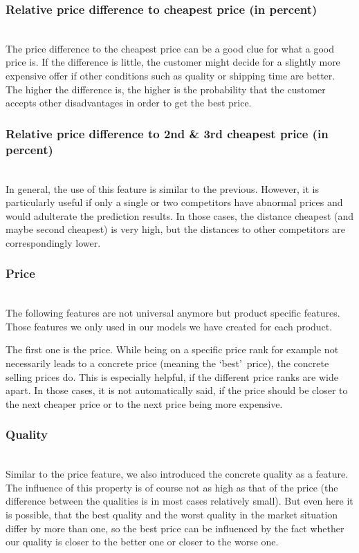 \subsubsection{Relative price difference to cheapest price (in percent)}
	~\\
	The price difference to the cheapest price can be a good clue for what a good price is. If the difference is little, the customer might decide for a slightly more expensive offer if other conditions such as quality or shipping time are better. The higher the difference is, the higher is the probability that the customer accepts other disadvantages in order to get the best price.
\subsubsection{Relative price difference to 2nd \& 3rd cheapest price (in percent)}
\label{sec:pricediff3}
	~\\
	In general, the use of this feature is similar to the previous. However, it is particularly useful if only a single or two competitors have abnormal prices and would adulterate the prediction results. In those cases, the distance cheapest (and maybe second cheapest) is very high, but the distances to other competitors are correspondingly lower.
\subsubsection{Price}
	~\\
	The following features are not universal anymore but product specific features. Those features we only used in our models we have created for each product.

	The first one is the price. While being on a specific price rank for example not necessarily leads to a concrete price (meaning the \lq{best}\rq\ price), the concrete selling prices do. This is especially helpful, if the different price ranks are wide apart. In those cases, it is not automatically said, if the price should be closer to the next cheaper price or to the next price being more expensive.
\subsubsection{Quality}
	~\\
	Similar to the price feature, we also introduced the concrete quality as a feature. The influence of this property is of course not as high as that of the price (the difference between the qualities is in most cases relatively small). But even here it is possible, that the best quality and the worst quality in the market situation differ by more than one, so the best price can be influenced by the fact whether our quality is closer to the better one or closer to the worse one.
